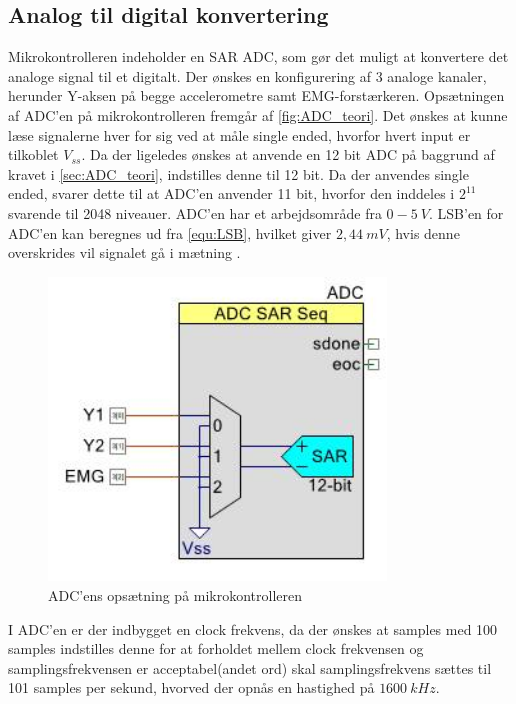 \subsection{Analog til digital konvertering}
Mikrokontrolleren indeholder en SAR ADC, som gør det muligt at konvertere det analoge signal til et digitalt. Der ønskes en konfigurering af 3 analoge kanaler, herunder Y-aksen på begge accelerometre samt EMG-forstærkeren. Opsætningen af ADC'en på mikrokontrolleren fremgår af \autoref{fig:ADC_teori}. Det ønskes at kunne læse signalerne hver for sig ved at måle single ended, hvorfor hvert input er tilkoblet $V_{ss}$. Da der ligeledes ønskes at anvende en 12 bit ADC på baggrund af kravet i \autoref{sec:ADC_teori}, indstilles denne til 12 bit. Da der anvendes single ended, svarer dette til at ADC'en anvender 11 bit, hvorfor den inddeles i $2^{11}$ svarende til 2048 niveauer. ADC'en har et arbejdsområde fra $0-5~V$. LSB'en for ADC'en kan beregnes ud fra \autoref{equ:LSB}, hvilket giver $2,44~mV$, hvis denne overskrides vil signalet gå i mætning \citep{ADC2014}. 
\begin{figure}[H]
\centering
\includegraphics[width=0.8\textwidth]{figures/implementering/ADC_imp.jpeg}
\caption{ADC'ens opsætning på mikrokontrolleren}
\label{fig:ADC_teori}
\end{figure}

I ADC'en er der indbygget en clock frekvens, da der ønskes at samples med 100 samples indstilles denne for at forholdet mellem clock frekvensen og samplingsfrekvensen er acceptabel(andet ord) skal samplingsfrekvens sættes til 101 samples per sekund, hvorved der opnås en hastighed på $1600~kHz$. 
